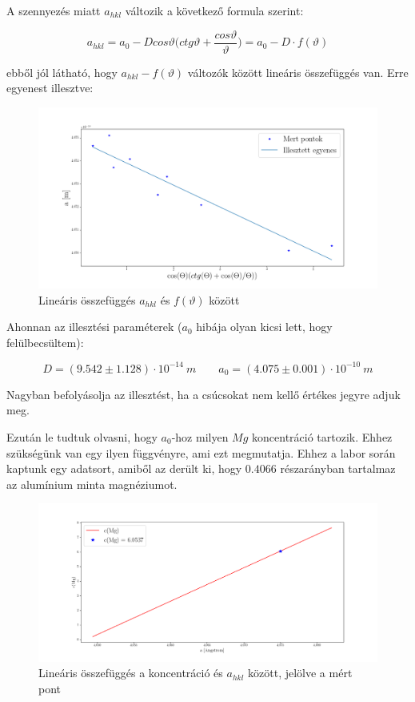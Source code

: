 \documentclass[a4paper,12pt]{article}
\begin{document}
\par A szennyezés miatt $a_{hkl}$ változik a következő formula szerint:

\begin{equation*}
a_{hkl} = a_{0} - Dcos\vartheta\Big(ctg\vartheta + \frac{cos\vartheta}{\vartheta}\Big) = a_{0} - D\cdot f(\vartheta)
\end{equation*}

\par ebből jól látható, hogy $a_{hkl} - f(\vartheta)$ változók között lineáris összefüggés van. Erre egyenest illesztve:

\begin{figure}[H]
\centering
\includegraphics[width=1\textwidth]{./egyenes.png}
\caption{Lineáris összefüggés $a_{hkl}$ és $f(\vartheta)$ között}
\end{figure} 

\par Ahonnan az illesztési paraméterek ($a_{0}$ hibája olyan kicsi lett, hogy felülbecsültem):

\begin{equation*}
D = (9.542 \pm 1.128) \cdot 10^{-14} ~m \quad \quad
a_{0} = (4.075 \pm 0.001) \cdot 10^{-10} ~m
\end{equation*}

\par Nagyban befolyásolja az illesztést, ha a csúcsokat nem kellő értékes jegyre adjuk meg.

\par Ezután le tudtuk olvasni, hogy $a_{0}$-hoz milyen $Mg$ koncentráció tartozik. Ehhez szükségünk van egy ilyen függvényre, ami ezt megmutatja. Ehhez a labor során kaptunk egy adatsort, amiből az derült ki, hogy $0.4066$ részarányban tartalmaz az alumínium minta magnéziumot.

\begin{figure}[H]
\centering
\includegraphics[width=.96\textwidth]{./konc.png}
\caption{Lineáris összefüggés a koncentráció és $a_{hkl}$ között, jelölve a mért pont}
\end{figure} 
\end{document}
